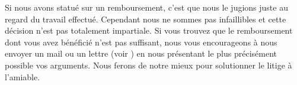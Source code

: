 ﻿Si nous avons statué sur un remboursement, c’est que nous le jugions juste au regard du travail effectué. Cependant nous ne sommes pas infaillibles et cette décision n’est pas totalement impartiale. Si vous trouvez que le remboursement dont vous avez bénéficié n’est pas suffisant, nous vous encourageons à nous envoyer un mail ou un lettre (voir ) en nous présentant le plus précisément possible vos arguments. Nous ferons de notre mieux pour solutionner le litige à l’amiable.